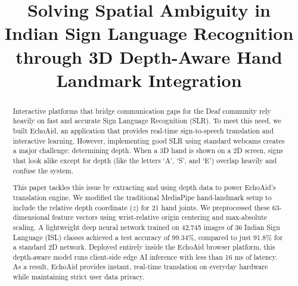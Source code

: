 \documentclass[conference]{IEEEtran}
\begin{document}
\title{Solving Spatial Ambiguity in Indian Sign Language Recognition through 3D Depth-Aware Hand Landmark Integration}

\author{
\and
{}
}

\maketitle

\begin{abstract}
Interactive platforms that bridge communication gaps for the Deaf community rely heavily on fast and accurate Sign Language Recognition (SLR). To meet this need, we built EchoAid, an application that provides real-time sign-to-speech translation and interactive learning. However, implementing good SLR using standard webcams creates a major challenge: determining depth. When a 3D hand is shown on a 2D screen, signs that look alike except for depth (like the letters `A', `S', and `E') overlap heavily and confuse the system.

This paper tackles this issue by extracting and using depth data to power EchoAid's translation engine. We modified the traditional MediaPipe hand-landmark setup to include the relative depth coordinate ($z$) for 21 hand joints. We preprocessed these 63-dimensional feature vectors using wrist-relative origin centering and max-absolute scaling. A lightweight deep neural network trained on 42,745 images of 36 Indian Sign Language (ISL) classes achieved a test accuracy of 99.34\%, compared to just 91.8\% for a standard 2D network. Deployed entirely inside the EchoAid browser platform, this depth-aware model runs client-side edge AI inference with less than 16 ms of latency. As a result, EchoAid provides instant, real-time translation on everyday hardware while maintaining strict user data privacy.
\end{abstract}
\end{document}
